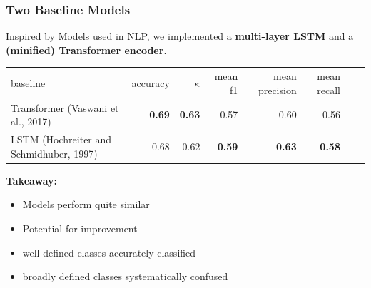 \documentclass[%
  aspectratio=169,
  9pt,
  USenglish,
  titlegraphic, %
  affiliationintitlepagehead,
  progressbar,
]{beamer}
\begin{document}
\begin{frame}
\frametitle{Two Baseline Models}

\Large
Inspired by Models used in NLP, we implemented a \textbf{multi-layer LSTM} and a \textbf{(minified) Transformer encoder}.

\vspace{1em}
\normalsize

\begin{tabular}{lrrrrrrr}
\toprule
baseline & accuracy & $\kappa$ & mean f1 & mean precision  & mean recall \\
\cmidrule(lr){1-1}\cmidrule(lr){2-2}\cmidrule(lr){3-3}\cmidrule(lr){4-4}\cmidrule(lr){5-5}\cmidrule(lr){6-6}\cmidrule(lr){7-7}
Transformer {\small (Vaswani et al., 2017)} & \textbf{0.69}  &  \textbf{0.63} & 0.57 & {0.60} & 0.56 \\
LSTM {\small (Hochreiter and Schmidhuber, 1997)} & 0.68 & 0.62 & \textbf{0.59} & \textbf{0.63} & \textbf{0.58} \\
\bottomrule
\end{tabular}

\vspace{1em}

\Large
\textbf{Takeaway:} 
\begin{itemize}
\item Models perform quite similar
\item Potential for improvement
\item well-defined classes accurately classified
\item broadly defined classes systematically confused
\end{itemize}

\end{frame}
\end{document}
